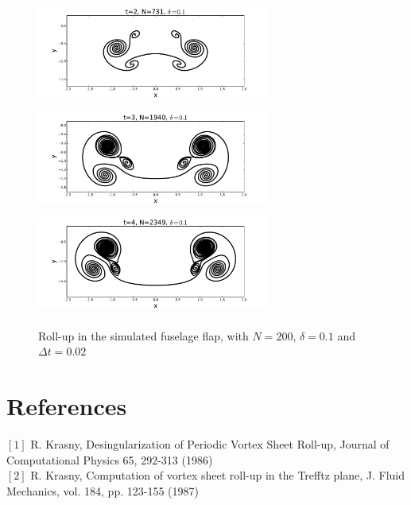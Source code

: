 \documentclass[12pt,twoside]{article}
\begin{document}
\begin{figure}
\begin{center}
	\includegraphics[width=3in,height=1.33in]{FU5.pdf}
		\includegraphics[width=3in,height=1.33in]{FU6.pdf}
			\includegraphics[width=3in,height=1.33in]{FU7.pdf}
\end{center}
\caption{Roll-up in the simulated fuselage flap, with $N=200$, $\delta=0.1$ and $\Delta t=0.02$}
\end{figure}
\clearpage
\section{References}
$[1]$ R. Krasny, Desingularization of Periodic Vortex Sheet Roll-up, Journal of Computational Physics 65, 292-313 (1986)\\ 
$[2]$ R. Krasny, Computation of vortex sheet roll-up in the Trefftz plane, J. Fluid Mechanics, vol. 184, pp. 123-155  (1987)  
\end{document}
